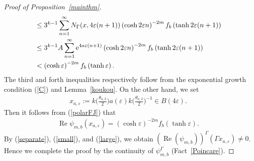 \begin{proof}[Proof of Proposition~\ref{mainthm}]
\begin{align}
&\leq 3^{k-1}\sum_{n = 1}^{\infty} N_{\Gamma}(x, 4\varepsilon (n + 1))\left(\cosh
2\varepsilon n \right)^{-2m} f_{b}\left(\tanh 2\varepsilon (n+1)\right)
\nonumber \\
&\leq 3^{k-1}A\sum_{n = 1}^{\infty} {\rm e}^{4a\varepsilon (n+1)}\left(\cosh 2\varepsilon n
\right)^{-2m} f_{b}\left(\tanh 2\varepsilon (n+1)\right)
\nonumber \\
&< \left(\cosh \varepsilon\right)^{-2m} f_{b}
\left(\tanh \varepsilon\right).
\label{small}
\end{align}
The third and forth inequalities respectively follow from
the exponential growth condition (\ref{C}) and Lemma~\ref{koukou}.
On the other hand, we set
\begin{gather*}
x_{a,\varepsilon}:=
k\bigg(\frac{\theta_{a,3}}{2}\bigg)a(\varepsilon)k\bigg(\frac{\theta_{a,3}}{2}\bigg)^{-1} \in B(4\varepsilon).
\end{gather*}
Then it follows from (\ref{polarFJ}) that
\begin{align}
\label{large}
\operatorname{Re} \psi_{m,b}(x_{a,\varepsilon})
=\left(\cosh \varepsilon\right)^{-2m} f_{b}
\left(\tanh \varepsilon\right).
\end{align}
By (\ref{separate}), (\ref{small}), and (\ref{large}),
we obtain $(\operatorname{Re}(\psi_{m,b}))^{\Gamma}(\Gamma x_{a,\varepsilon})\neq 0$.
Hence we complete the proof
by the continuity of $\psi_{m,b}^{\Gamma}$ (Fact~\ref{Poincare}).
\end{proof}
